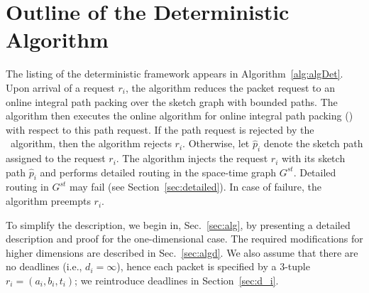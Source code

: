\documentclass[11pt]{article}
\newcommand{\route}{\text{\sc{ipp}}}
\newcommand{\IPP}{\route}
\newcommand{\opt}{\text{\textsc{opt}}}
\newcommand{\pmax}{p_{\max}}
\newenvironment{proof sketch}[1]{\noindent {\emph{Proof sketch of #1:}}}{\hfill \qed}
\begin{document}
\begin{comment}
  \item Using the same technique, one can prove that $|\opt_f(R \mid \pmax)|
  \geq (1-\varepsilon) \cdot |\opt_f(R)|$ for
  $\pmax \geq (\sum_i \ell_i)\cdot\left(1+2\gamma n\cdot \ln \frac 1{\varepsilon}\right)$.
\end{comment}


\section{Outline of the Deterministic Algorithm}\label{sec:outline}
The listing of the deterministic framework appears in
Algorithm~\ref{alg:algDet}.  Upon arrival of a request $r_i$, the
algorithm reduces the packet request to an online integral path
packing over the sketch graph with bounded paths. The algorithm then
executes the online algorithm for online integral path packing (\IPP)
with respect to this path request. If the path request is rejected by
the \IPP\ algorithm, then the algorithm rejects $r_i$.  Otherwise, let
$\hat p_i$ denote the sketch path assigned to the request $r_i$. The
algorithm injects the request $r_i$ with its sketch path $\hat p_i$
and performs detailed routing in the space-time graph $G^{st}$.
Detailed routing in $G^{st}$ may fail (see
Section~\ref{sec:detailed}). In case of failure, the algorithm
preempts $r_i$.


To simplify the description, we begin in, Sec.~\ref{sec:alg}, by
presenting a detailed description and proof for the one-dimensional
case.  The required modifications for higher dimensions are described
in Sec.~\ref{sec:algd}.  We also assume that there are no deadlines
(i.e., $d_i = \infty$), hence each packet is specified by a $3$-tuple
$r_i=(a_i,b_i,t_i)$; we reintroduce deadlines in
Section~\ref{sec:d_i}.
\end{document}

